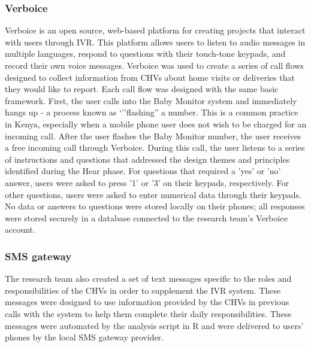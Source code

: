 \subsubsection{Verboice}

Verboice is an open source, web-based platform for creating projects that interact with users through IVR. This platform allows users to listen to audio messages in multiple languages, respond to questions with their touch-tone keypads, and record their own voice messages. Verboice was used to create a series of call flows designed to collect information from CHVs about home visits or deliveries that they would like to report. Each call flow was designed with the same basic framework. First, the user calls into the Baby Monitor system and immediately hangs up - a process known as `''flashing'' a number. This is a common practice in Kenya, especially when a mobile phone user does not wish to be charged for an incoming call. After the user flashes the Baby Monitor number, the user receives a free incoming call through Verboice. During this call, the user listens to a series of instructions and questions that addressed the design themes and principles identified during the Hear phase. For questions that required a 'yes' or 'no' answer, users were asked to press '1' or '3' on their keypads, respectively. For other questions, users were asked to enter numerical data through their keypads. No data or answers to questions were stored locally on their phones; all responses were stored securely in a database connected to the research team's Verboice account. 

\subsubsection{SMS gateway}
The research team also created a set of text messages specific to the roles and responsibilities of the CHVs in order to supplement the IVR system. These messages were designed to use information provided by the CHVs in previous calls with the system to help them complete their daily responsibilities. These messages were automated by the analysis script in R and were delivered to users' phones by the local SMS gateway provider. 


